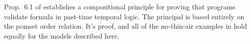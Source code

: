 Prop.~6.1 of \cite{DBLP:journals/pacmpl/JagadeesanJR20} establishes a
compositional principle for proving that programs validate formula in
past-time temporal logic.  The principal is based entirely on the pomset
order relation.  It's proof, and all of the no-thin-air examples in
\cite[]{DBLP:journals/pacmpl/JagadeesanJR20} hold equally for
the models described here.


